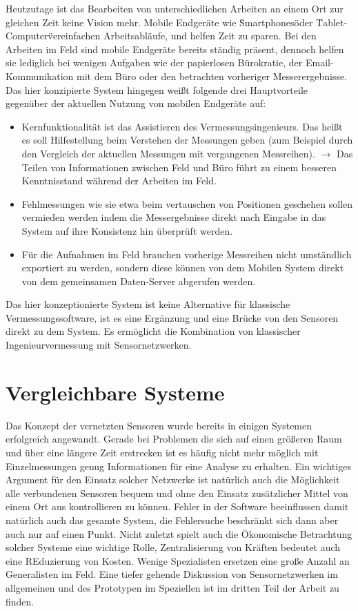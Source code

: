 Heutzutage ist das Bearbeiten von unterschiedlichen Arbeiten an einem Ort zur gleichen Zeit keine Vision mehr. Mobile Endgeräte wie \"Smartphones\" oder \"Tablet-Computer\" vereinfachen Arbeitsabläufe, und helfen Zeit zu sparen. Bei den Arbeiten im Feld sind mobile Endgeräte bereits ständig präsent, dennoch helfen sie lediglich bei wenigen Aufgaben wie der papierlosen Bürokratie, der Email-Kommunikation mit dem Büro oder den betrachten vorheriger Messerergebnisse. Das hier konzipierte System hingegen weißt folgende drei Hauptvorteile gegenüber der aktuellen Nutzung von mobilen Endgeräte auf:
\begin{itemize}
\item Kernfunktionalität ist das Assistieren des Vermessungsingenieurs. Das heißt es soll Hilfestellung beim Verstehen der Messungen geben (zum Beispiel durch den Vergleich der aktuellen Messungen mit vergangenen Messreihen). $\rightarrow$ Das Teilen von Informationen zwischen Feld und Büro führt zu einem besseren Kenntnisstand während der Arbeiten im Feld.
\item Fehlmessungen wie sie etwa beim vertauschen von Positionen geschehen sollen vermieden werden indem die Messergebnisse direkt nach Eingabe in das System auf ihre Konsistenz hin überprüft werden.
\item Für die Aufnahmen im Feld brauchen vorherige Messreihen nicht umständlich exportiert zu werden, sondern diese können von dem Mobilen System direkt von dem gemeinsamen Daten-Server abgerufen werden.
\end{itemize}
Das hier konzeptionierte System ist keine Alternative für klassische Vermessungssoftware, ist es eine Ergänzung und eine Brücke von den Sensoren direkt zu dem System. Es ermöglicht die Kombination von klassischer Ingenieurvermessung mit Sensornetzwerken.


\section{Vergleichbare Systeme}
Das Konzept der vernetzten Sensoren wurde bereits in einigen Systemen erfolgreich angewandt. Gerade bei Problemen die sich auf einen größeren Raum und über eine längere Zeit erstrecken ist es häufig nicht mehr möglich mit Einzelmessungen genug Informationen für eine Analyse zu erhalten. Ein wichtiges Argument für den Einsatz solcher Netzwerke ist natürlich auch die Möglichkeit alle verbundenen Sensoren bequem und ohne den Einsatz zusätzlicher Mittel von einem Ort aus kontrollieren zu können. Fehler in der Software beeinflussen damit natürlich auch das gesamte System, die Fehlersuche beschränkt sich dann aber auch nur auf einen Punkt. Nicht zuletzt spielt auch die Ökonomische Betrachtung solcher Systeme eine wichtige Rolle, Zentralisierung von Kräften bedeutet auch eine REduzierung von Kosten. Wenige Spezialisten ersetzen eine große Anzahl an Generalisten im Feld. Eine tiefer gehende Diskussion von Sensornetzwerken im allgemeinen und des Prototypen im Speziellen ist im dritten Teil der Arbeit zu finden.


